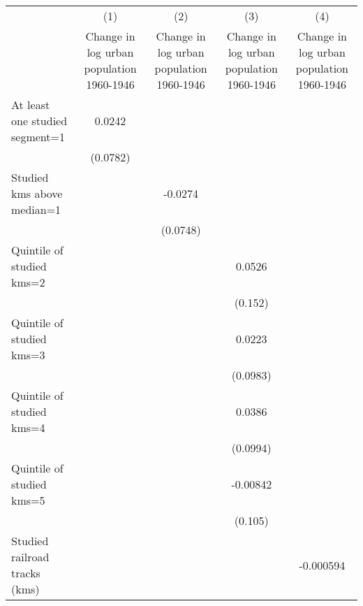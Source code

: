 {
\def\sym#1{\ifmmode^{#1}\else\(^{#1}\)\fi}
\begin{tabular}{l*{4}{c}}
\hline\hline
                    &\multicolumn{1}{c}{(1)}&\multicolumn{1}{c}{(2)}&\multicolumn{1}{c}{(3)}&\multicolumn{1}{c}{(4)}\\
                    &\multicolumn{1}{c}{Change in log urban population 1960-1946}&\multicolumn{1}{c}{Change in log urban population 1960-1946}&\multicolumn{1}{c}{Change in log urban population 1960-1946}&\multicolumn{1}{c}{Change in log urban population 1960-1946}\\
\hline
At least one studied segment=1&      0.0242         &                     &                     &                     \\
                    &    (0.0782)         &                     &                     &                     \\
[1em]
Studied kms above median=1&                     &     -0.0274         &                     &                     \\
                    &                     &    (0.0748)         &                     &                     \\
[1em]
Quintile of studied kms=2&                     &                     &      0.0526         &                     \\
                    &                     &                     &     (0.152)         &                     \\
[1em]
Quintile of studied kms=3&                     &                     &      0.0223         &                     \\
                    &                     &                     &    (0.0983)         &                     \\
[1em]
Quintile of studied kms=4&                     &                     &      0.0386         &                     \\
                    &                     &                     &    (0.0994)         &                     \\
[1em]
Quintile of studied kms=5&                     &                     &    -0.00842         &                     \\
                    &                     &                     &     (0.105)         &                     \\
[1em]
Studied railroad tracks (kms)&                     &                     &                     &   -0.000594         \\

\end{tabular}}
